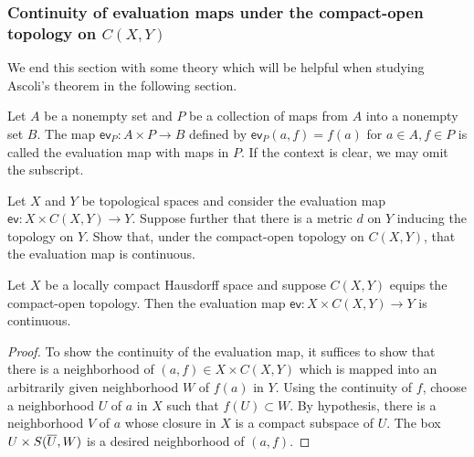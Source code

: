 \subsubsection{Continuity of evaluation maps under the compact-open topology on $C(X, Y)$}

We end this section with some theory which will be helpful when studying Ascoli's theorem in the following section.

\begin{defi}
    Let $A$ be a nonempty set and $P$ be a collection of maps from $A$ into a nonempty set $B$.
    The map $\textsf{ev}_P: A\times P\rightarrow B$ defined by $\textsf{ev}_P(a, f)=f(a)$ for $a\in A, f\in P$ is called the evaluation map with maps in $P$.
    If the context is clear, we may omit the subscript.
\end{defi}

\begin{exmp}
    Let $X$ and $Y$ be topological spaces and consider the evaluation map $\textsf{ev}: X\times C(X, Y)\rightarrow Y$.
    Suppose further that there is a metric $d$ on $Y$ inducing the topology on $Y$.
    Show that, under the compact-open topology on $C(X, Y)$, that the evaluation map is continuous.
\end{exmp}

\begin{thm}\label{ev is continuous if the domain is LCH}
    Let $X$ be a locally compact Hausdorff space and suppose $C(X, Y)$ equips the compact-open topology.
    Then the evaluation map $\textsf{ev}: X\times C(X, Y)\rightarrow Y$ is continuous.
\end{thm}
\begin{proof}
    To show the continuity of the evaluation map, it suffices to show that there is a neighborhood of $(a, f)\in X\times C(X, Y)$ which is mapped into an arbitrarily given neighborhood $W$ of $f(a)$ in $Y$.
    Using the continuity of $f$, choose a neighborhood $U$ of $a$ in $X$ such that $f(U)\subset W$.
    By hypothesis, there is a neighborhood $V$ of $a$ whose closure in $X$ is a compact subspace of $U$.
    The box $U\times S(\overline{U}, W)$ is a desired neighborhood of $(a, f)$.
\end{proof}

